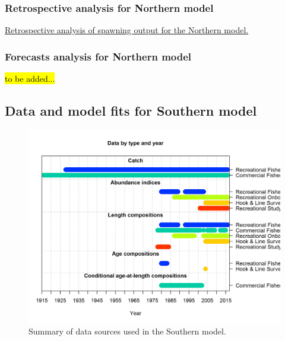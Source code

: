 \documentclass[12pt,]{article}
\begin{document}
\FloatBarrier

\subsubsection{Retrospective analysis for Northern
model}\label{retrospective-analysis-for-northern-model}

\href{Figures/retrospectives/retro.N_compare1_spawnbio.png}{Retrospective
analysis of spawning output for the Northern model. \label{fig:retro.N}}

\subsubsection{Forecasts analysis for Northern
model}\label{forecasts-analysis-for-northern-model}

\hl{to be added...}

\FloatBarrier

\newpage

\subsection{Data and model fits for Southern
model}\label{data-and-model-fits-for-southern-model}

\begin{figure}[htbp]
\centering
\includegraphics{r4ss/plots_mod2/data_plot.png}
\caption{Summary of data sources used in the Southern model.
\label{fig:data_plot.S}}
\end{figure}

\FloatBarrier
\end{document}
